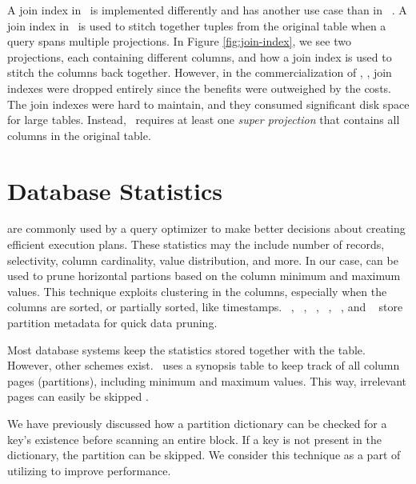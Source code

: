 
A join index in \cstore~is implemented differently and has another use case than in \oracle~\cite{Lamb2012-kg}. A join index in \cstore~is used to stitch together tuples from the original table when a query spans multiple projections. In Figure \ref{fig:join-index}, we see two projections, each containing different columns, and how a join index is used to stitch the columns back together. However, in the commercialization of \cstore, \vertica, join indexes were dropped entirely since the benefits were outweighed by the costs. The join indexes were hard to maintain, and they consumed significant disk space for large tables. Instead, \vertica~requires at least one \textit{super projection} that contains all columns in the original table.

\section{Database Statistics}
\label{sec:Database Statistics}
 are commonly used by a query optimizer to make better decisions about creating efficient execution plans. These statistics may the include number of records, selectivity, column cardinality, value distribution, and more. In our case,  can be used to prune horizontal partions based on the column minimum and maximum values. This technique exploits clustering in the columns, especially when the columns are sorted, or partially sorted, like timestamps. \oracle~\cite{Lahiri2015-mz}, \ibm~\cite{Raman2013-em}, \vertica~\cite{Lamb2012-kg}, \monetx~\cite{Boncz2005-wj}, \mssql~\cite{Larson2013-mc}, and \exasol~\cite{Exasol2014-xh} store partition metadata for quick data pruning.

Most database systems keep the statistics stored together with the table. However, other schemes exist. \ibm~uses a synopsis table to keep track of all column pages (partitions), including minimum and maximum values. This way, irrelevant pages can easily be skipped \cite{Raman2013-em}.

We have previously discussed how a partition dictionary can be checked for a key's existence before scanning an entire block. If a key is not present in the dictionary, the partition can be skipped. We consider this technique as a part of utilizing  to improve performance.

